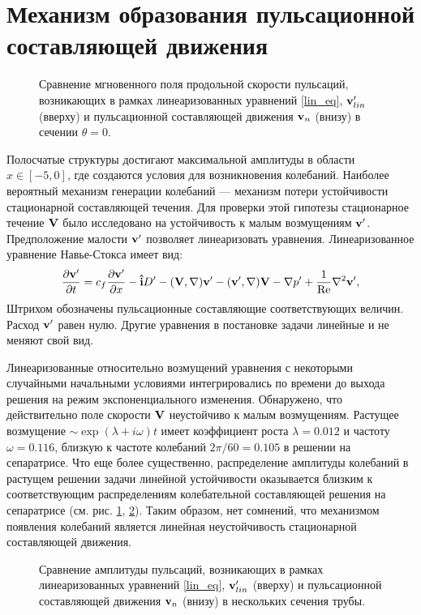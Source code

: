 \section{Механизм образования пульсационной составляющей движения}

\begin{figure}[h]
\caption{Сравнение мгновенного поля продольной скорости пульсаций, возникающих в рамках линеаризованных уравнений \eqref{lin_eq}, $\mathbf{v}'_{lin}$ (вверху) и пульсационной составляющей движения $\mathbf{v}_n$ (внизу) в сечении $\theta = 0$.}
\label{lin_ls_cmp_pic}
\end{figure}

Полосчатые структуры достигают максимальной амплитуды в области $x\in[-5,0]$, где создаются условия для возникновения колебаний. Наиболее вероятный механизм генерации колебаний --- механизм потери устойчивости стационарной составляющей течения. Для проверки этой гипотезы стационарное течение $\mathbf{V}$ было исследовано на устойчивость к малым возмущениям $\mathbf{v}'$. Предположение малости $\mathbf{v}'$ позволяет линеаризовать уравнения. Линеаризованное уравнение Навье-Стокса имеет вид: 
\begin{equation} \label{lin_eq}
\frac{\partial \mathbf{v}'}{\partial t} = c_f \frac{\partial \mathbf{v}'}{\partial x} - \mathbf{\hat{i}} D' - (\mathbf{V}, \nabla) \mathbf{v}' - (\mathbf{v}', \nabla) \mathbf{V} - \nabla p' + \frac{1}{\operatorname{Re}} \nabla^2 \mathbf{v}',
\end{equation}
Штрихом обозначены пульсационные составляющие соответствующих величин. Расход $\mathbf{v}'$ равен нулю. Другие уравнения в постановке задачи линейные и не меняют свой вид. 

Линеаризованные относительно возмущений уравнения с некоторыми случайными начальными условиями интегрировались по времени до выхода решения на режим экспоненциального изменения. Обнаружено, что действительно поле скорости $\mathbf{V}$ неустойчиво к малым возмущениям. Растущее возмущение $\sim\exp(\lambda+i\omega)t$ имеет коэффициент роста $\lambda=0.012$ и частоту $\omega=0.116$, близкую к частоте колебаний $2\pi/60=0.105$ в решении на сепаратрисе. Что еще более существенно, распределение амплитуды колебаний в растущем решении задачи линейной устойчивости оказывается близким к соответствующим распределениям колебательной составляющей решения на сепаратрисе (см. рис. \ref{lin_ls_cmp_pic}, \ref{lin_amp_cmp_pic}). Таким образом, нет сомнений, что механизмом появления колебаний является линейная неустойчивость стационарной составляющей движения. 

\begin{figure}[h]
\caption{Сравнение амплитуды пульсаций, возникающих в рамках линеаризованных уравнений \eqref{lin_eq}, $\mathbf{v}'_{lin}$ (вверху) и пульсационной составляющей движения $\mathbf{v}_n$ (внизу) в нескольких сечения трубы.}
\label{lin_amp_cmp_pic}
\end{figure}

